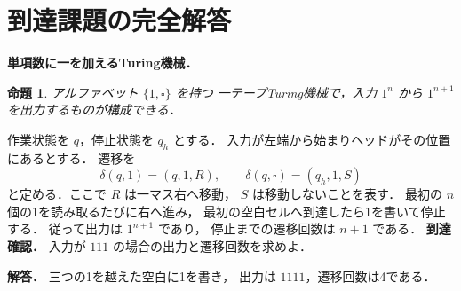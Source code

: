 \documentclass[a5paper,10pt,onecolumn]{jsarticle}
\makeatletter
\theoremstyle{mathnotetheorem}
\newtheorem{proposition}[theorem]{命題}
\renewcommand{\proofname}{証明}
\renewenvironment{proof}[1][\proofname]{%
  \par\pushQED{\qed}\normalfont\topsep4\p@\@plus2\p@\relax
  \trivlist\item[\hskip\labelsep\bfseries #1]\ignorespaces
}{\popQED\endtrivlist\@endpefalse}
\makeatother
\begin{document}
\section{到達課題の完全解答}
\noindent\textbf{単項数に一を加えるTuring機械．}
\begin{proposition}
アルファベット $\{1,\square\}$ を持つ
一テープTuring機械で，入力 $1^n$ から
$1^{n+1}$ を出力するものが構成できる．
\end{proposition}
\begin{proof}
作業状態を $q$，停止状態を $q_h$ とする．
入力が左端から始まりヘッドがその位置にあるとする．
遷移を
\[
\delta(q,1)=(q,1,R),\qquad
\delta(q,\square)=(q_h,1,S)
\]
と定める．ここで $R$ は一マス右へ移動，
$S$ は移動しないことを表す．
最初の $n$ 個の1を読み取るたびに右へ進み，
最初の空白セルへ到達したら1を書いて停止する．
従って出力は $1^{n+1}$ であり，
停止までの遷移回数は $n+1$ である．
\end{proof}
\noindent\textbf{到達確認．}
入力が $111$ の場合の出力と遷移回数を求めよ．
\par\noindent\textbf{解答．}
三つの1を越えた空白に1を書き，
出力は $1111$，遷移回数は4である．
\end{document}

